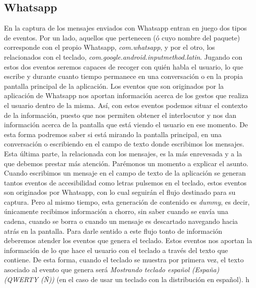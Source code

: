 \documentclass[12pt,a4paper,oneside]{book} %
\begin{document}
\subsection{Whatsapp}
En la captura de los mensajes enviados con Whatsapp entran en juego dos tipos de eventos. Por un lado, aquellos que pertenecen (ó cuyo nombre del paquete) corresponde con el propio Whatsapp, \textit{com.whatsapp}, y por el otro, los relacionados con el teclado, \textit{com.google.android.inputmethod.latin}.
\newline \newline 
Jugando con estos dos eventos seremos capaces de recoger con quién habla el usuario, lo que escribe y durante cuanto tiempo permanece en una conversación o en la propia pantalla principal de la aplicación. 
\newline \newline 
Los eventos que son originados por la aplicación de Whatsapp nos aportan información acerca de los gestos que realiza el usuario dentro de la misma. Así, con estos eventos podemos situar el contexto de la información, puesto que nos permiten obtener el interlocutor y nos dan información acerca de la pantalla que está viendo el usuario en ese momento. De esta forma podremos saber si está mirando la pantalla principal, en una conversación o escribiendo en el campo de texto donde escribimos los mensajes. Esta última parte, la relacionada con los mensajes, es la más enrevesada y a la que debemos prestar más atención. Parémonos un momento a explicar el asunto. 
\newline \newline 
Cuando escribimos un mensaje en el campo de texto de la aplicación se generan tantos eventos de accesibilidad como letras pulsemos en el teclado, estos eventos son originados por Whatsapp, con lo cual seguirán el flujo destinado para su captura. Pero al mismo tiempo, esta generación de contenido es \textit{dummy}, es decir, únicamente recibimos información a chorro, sin saber cuando se envía una cadena, cuando se borra o cuando un mensaje es descartado navegando hacia atrás en la pantalla. 
\newline \newline 
Para darle sentido a este flujo tonto de información deberemos atender los eventos que genera el teclado. Estos eventos nos aportan la información de lo que hace el usuario con el teclado a través del texto que contiene. De esta forma, cuando el teclado se muestra por primera vez, el texto asociado al evento que genera será \textit{Mostrando teclado español (España) (QWERTY (Ñ))} (en el caso de usar un teclado con la distribución en español). h
\end{document}
